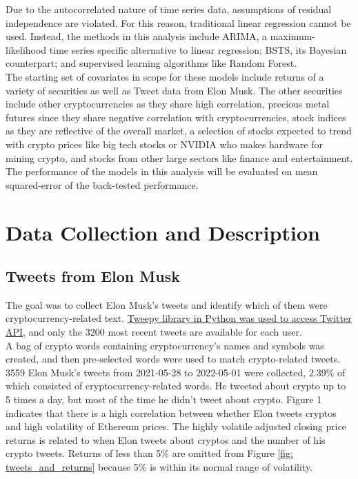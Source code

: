 \documentclass{article}
\begin{document}
\noindent Due to the autocorrelated nature of time series data, assumptions of residual independence are violated. For this reason, traditional linear regression cannot be used. Instead, the methods in this analysis include ARIMA, a maximum-likelihood time series specific alternative to linear regression; BSTS, its Bayesian counterpart; and supervised learning algorithms like Random Forest. \\

\noindent The starting set of covariates in scope for these models include returns of a variety of securities as well as Tweet data from Elon Musk. The other securities include other cryptocurrencies as they share high correlation, precious metal futures since they share negative correlation with cryptocurrencies, stock indices as they are reflective of the overall market, a selection of stocks expected to trend with crypto prices like big tech stocks or NVIDIA who makes hardware for mining crypto, and stocks from other large sectors like finance and entertainment.\\

\noindent The performance of the models in this analysis will be evaluated on mean squared-error of the back-tested performance.

\newpage
	
\section{Data Collection and Description}
\subsection{Tweets from Elon Musk}

The goal was to collect Elon Musk’s tweets and identify which of them were cryptocurrency-related text. \href{https://github.com/Xinming-Dai/cryptocurrency-value-prediction/blob/main/tweets/functions/get_user_tweets.py}{Tweepy library in Python was used to access Twitter API}, and only the 3200 most recent tweets are available for each user.\\



\noindent A bag of crypto words containing cryptocurrency’s names and symbols was created, and then pre-selected words were used to match crypto-related tweets. 3559 Elon Musk’s tweets from 2021-05-28 to 2022-05-01 were collected, 2.39\% of which consisted of cryptocurrency-related words. He tweeted about crypto up to 5 times a day, but most of the time he didn’t tweet about crypto. Figure 1 indicates that there is a high correlation between whether Elon tweets cryptos and high volatility of Ethereum prices. The highly volatile adjusted closing price returns is related to when Elon tweets about cryptos and the number of his crypto tweets. Returns of less than 5\% are omitted from Figure \ref{fig: tweets_and_returns} because 5\% is within its normal range of volatility.
\end{document}

